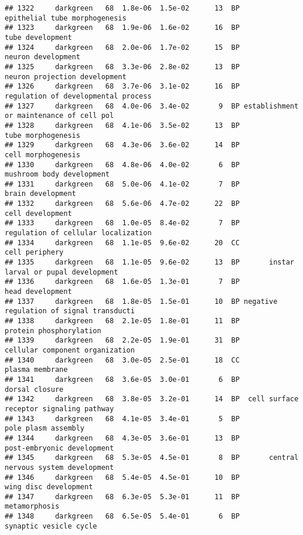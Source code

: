 \documentclass[]{article}
\begin{document}
\begin{verbatim}
## 1322     darkgreen   68  1.8e-06  1.5e-02      13  BP            epithelial tube morphogenesis
## 1323     darkgreen   68  1.9e-06  1.6e-02      16  BP                         tube development
## 1324     darkgreen   68  2.0e-06  1.7e-02      15  BP                       neuron development
## 1325     darkgreen   68  3.3e-06  2.8e-02      13  BP            neuron projection development
## 1326     darkgreen   68  3.7e-06  3.1e-02      16  BP      regulation of developmental process
## 1327     darkgreen   68  4.0e-06  3.4e-02       9  BP establishment or maintenance of cell pol
## 1328     darkgreen   68  4.1e-06  3.5e-02      13  BP                       tube morphogenesis
## 1329     darkgreen   68  4.3e-06  3.6e-02      14  BP                       cell morphogenesis
## 1330     darkgreen   68  4.8e-06  4.0e-02       6  BP                mushroom body development
## 1331     darkgreen   68  5.0e-06  4.1e-02       7  BP                        brain development
## 1332     darkgreen   68  5.6e-06  4.7e-02      22  BP                         cell development
## 1333     darkgreen   68  1.0e-05  8.4e-02       7  BP      regulation of cellular localization
## 1334     darkgreen   68  1.1e-05  9.6e-02      20  CC                           cell periphery
## 1335     darkgreen   68  1.1e-05  9.6e-02      13  BP       instar larval or pupal development
## 1336     darkgreen   68  1.6e-05  1.3e-01       7  BP                         head development
## 1337     darkgreen   68  1.8e-05  1.5e-01      10  BP negative regulation of signal transducti
## 1338     darkgreen   68  2.1e-05  1.8e-01      11  BP                  protein phosphorylation
## 1339     darkgreen   68  2.2e-05  1.9e-01      31  BP          cellular component organization
## 1340     darkgreen   68  3.0e-05  2.5e-01      18  CC                          plasma membrane
## 1341     darkgreen   68  3.6e-05  3.0e-01       6  BP                           dorsal closure
## 1342     darkgreen   68  3.8e-05  3.2e-01      14  BP  cell surface receptor signaling pathway
## 1343     darkgreen   68  4.1e-05  3.4e-01       5  BP                      pole plasm assembly
## 1344     darkgreen   68  4.3e-05  3.6e-01      13  BP               post-embryonic development
## 1345     darkgreen   68  5.3e-05  4.5e-01       8  BP       central nervous system development
## 1346     darkgreen   68  5.4e-05  4.5e-01      10  BP                    wing disc development
## 1347     darkgreen   68  6.3e-05  5.3e-01      11  BP                            metamorphosis
## 1348     darkgreen   68  6.5e-05  5.4e-01       6  BP                   synaptic vesicle cycle

\end{verbatim}
\end{document}
